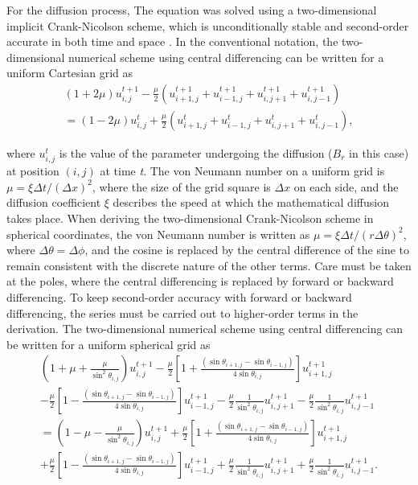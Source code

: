 For the diffusion process, The equation was solved using a two-dimensional implicit Crank-Nicolson scheme, which is unconditionally stable and second-order accurate in both time and space \citep{crank47}. In the conventional notation, the two-dimensional numerical scheme using central differencing can be written for a uniform Cartesian grid as 
\begin{eqnarray}
\nonumber\left(1+2\mu\right)u^{t+1}_{i,j}-\frac{\mu}{2}\left(u^{t+1}_{i+1,j}+u^{t+1}_{i-1,j}+u^{t+1}_{i,j+1}+u^{t+1}_{i,j-1}\right)\\
=\left(1-2\mu\right)u^{t}_{i,j}+\frac{\mu}{2}\left(u^{t}_{i+1,j}+u^{t}_{i-1,j}+u^{t}_{i,j+1}+u^{t}_{i,j-1}\right),
\end{eqnarray}

\noindent where $u^{t}_{i,j}$ is the value of the parameter undergoing the diffusion ($B_{r}$ in this case) at position $(i, j)$ at time \textit{t}. The von Neumann number on a uniform grid is $\mu=\xi{\Delta}t/\left({\Delta}x\right)^{2}$, where the size of the grid square is $\Delta x$ on each side, and the diffusion coefficient $\xi$ describes the speed at which the mathematical diffusion takes place. When deriving the two-dimensional Crank-Nicolson scheme in spherical coordinates, the von Neumann number is written as $\mu=\xi{\Delta}t/\left(r\Delta\theta\right)^{2}$, where $\Delta\theta=\Delta\phi$, and the cosine is replaced by the central difference of the sine to remain consistent with the discrete nature of the other terms. Care must be taken at the poles, where the central differencing is replaced by forward or backward differencing. To keep second-order accuracy with forward or backward differencing, the series must be carried out to higher-order terms in the derivation. The two-dimensional numerical scheme using central differencing can be written for a uniform spherical grid as
\begin{multline}
\left(1+\mu+\frac{\mu}{\sin^{2}\theta_{i,j}}\right)u^{t+1}_{i,j}-\frac{\mu}{2}\left[1+\frac{\left(\sin\theta_{i+1,j}-\sin\theta_{i-1,j}\right)}{4\sin\theta_{i,j}}\right]u^{t+1}_{i+1,j}\\
 -\frac{\mu}{2}\left[1-\frac{\left(\sin\theta_{i+1,j}-\sin\theta_{i-1,j}\right)}{4\sin\theta_{i,j}}\right]u^{t+1}_{i-1,j}-\frac{\mu}{2}\frac{1}{\sin^{2}\theta_{i,j}}u^{t+1}_{i,j+1}-\frac{\mu}{2}\frac{1}{\sin^{2}\theta_{i,j}}u^{t+1}_{i,j-1}\\
 =\left(1-\mu-\frac{\mu}{\sin^{2}\theta_{i,j}}\right)u^{t+1}_{i,j}+\frac{\mu}{2}\left[1+\frac{\left(\sin\theta_{i+1,j}-\sin\theta_{i-1,j}\right)}{4\sin\theta_{i,j}}\right]u^{t+1}_{i+1,j}\\
 +\frac{\mu}{2}\left[1-\frac{\left(\sin\theta_{i+1,j}-\sin\theta_{i-1,j}\right)}{4\sin\theta_{i,j}}\right]u^{t+1}_{i-1,j}+\frac{\mu}{2}\frac{1}{\sin^{2}\theta_{i,j}}u^{t+1}_{i,j+1}+\frac{\mu}{2}\frac{1}{\sin^{2}\theta_{i,j}}u^{t+1}_{i,j-1}.
 \label{CN Spherical}
\end{multline}

